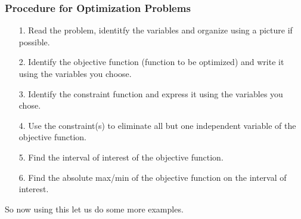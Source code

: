 \documentclass[12pt,reqno]{article}
\theoremstyle{definition}
\begin{document}
\subsubsection{Procedure for Optimization Problems}
	\begin{enumerate}
		\item[1.] Read the problem, identitfy the variables and organize using a picture if possible. 
		\item[2.] Identify the objective function (function to be optimized) and write it using the variables you choose. 
		\item[3.] Identify the constraint function and express it using the variables you chose. 
		\item[4.] Use the constraint(s) to eliminate all but one independent variable of the objective function. 
		\item[5.] Find the interval of interest of the objective function. 
		\item[6.] Find the absolute max/min of the objective function on the interval of interest.
	\end{enumerate}
	
So now using this let us do some more examples. 
\end{document}
